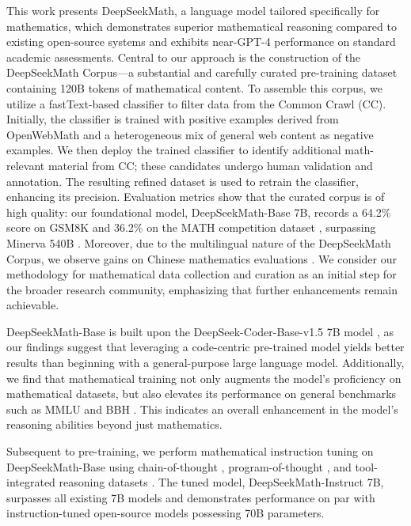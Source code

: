 This work presents DeepSeekMath, a language model tailored specifically for mathematics, which demonstrates superior mathematical reasoning compared to existing open-source systems and exhibits near-GPT-4 performance on standard academic assessments. Central to our approach is the construction of the DeepSeekMath Corpus—a substantial and carefully curated pre-training dataset containing 120B tokens of mathematical content. To assemble this corpus, we utilize a fastText-based classifier \citep{joulin2016fasttext} to filter data from the Common Crawl (CC). Initially, the classifier is trained with positive examples derived from OpenWebMath \citep{openwebmath} and a heterogeneous mix of general web content as negative examples. We then deploy the trained classifier to identify additional math-relevant material from CC; these candidates undergo human validation and annotation. The resulting refined dataset is used to retrain the classifier, enhancing its precision. Evaluation metrics show that the curated corpus is of high quality: our foundational model, DeepSeekMath-Base 7B, records a 64.2\% score on GSM8K \citep{gsm8k} and 36.2\% on the MATH competition dataset \citep{MATH}, surpassing Minerva 540B \citep{minerva}. Moreover, due to the multilingual nature of the DeepSeekMath Corpus, we observe gains on Chinese mathematics evaluations \citep{wei2023cmath,agieval}. We consider our methodology for mathematical data collection and curation as an initial step for the broader research community, emphasizing that further enhancements remain achievable.

DeepSeekMath-Base is built upon the DeepSeek-Coder-Base-v1.5 7B model \citep{deepseek-coder}, as our findings suggest that leveraging a code-centric pre-trained model yields better results than beginning with a general-purpose large language model. Additionally, we find that mathematical training not only augments the model’s proficiency on mathematical datasets, but also elevates its performance on general benchmarks such as MMLU \citep{mmlu} and BBH \citep{bbh}. This indicates an overall enhancement in the model's reasoning abilities beyond just mathematics.

Subsequent to pre-training, we perform mathematical instruction tuning on DeepSeekMath-Base using chain-of-thought \citep{cot}, program-of-thought \citep{pot,pal}, and tool-integrated reasoning datasets \citep{tora}. The tuned model, DeepSeekMath-Instruct 7B, surpasses all existing 7B models and demonstrates performance on par with instruction-tuned open-source models possessing 70B parameters.

